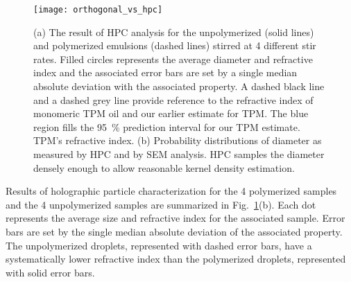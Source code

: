 
\begin{figure}
    \centering
    \texttt{[image: orthogonal\_vs\_hpc]}
    \caption{(a) The result of HPC analysis for the unpolymerized (solid lines) and polymerized
      emulsions (dashed lines) stirred at \num{4} different stir rates. Filled circles
      represents the average diameter and refractive index and the associated error bars
      are set by a single median absolute deviation with the associated property.
      A dashed black line and a dashed grey line provide reference to the
      refractive index of monomeric TPM oil and our earlier estimate for TPM. The blue region
      fills the \SI{95}{\percent} prediction interval for our TPM estimate.
      TPM's refractive index. (b) Probability distributions of diameter as measured by
      HPC and by SEM analysis. HPC samples the diameter densely enough to allow
      reasonable kernel density estimation.}
    \label{fig:hpc_stir_rate}
\end{figure}


Results of holographic particle characterization for the \num{4} polymerized samples
and the \num{4} unpolymerized samples are summarized in Fig.~\ref{fig:hpc_stir_rate}(b).
Each dot represents the average size and refractive index for the associated sample.
Error bars are set by the single median absolute deviation of the associated property.
The unpolymerized droplets, represented with dashed error bars, have a systematically
lower refractive index than the polymerized droplets, represented with solid error bars.

